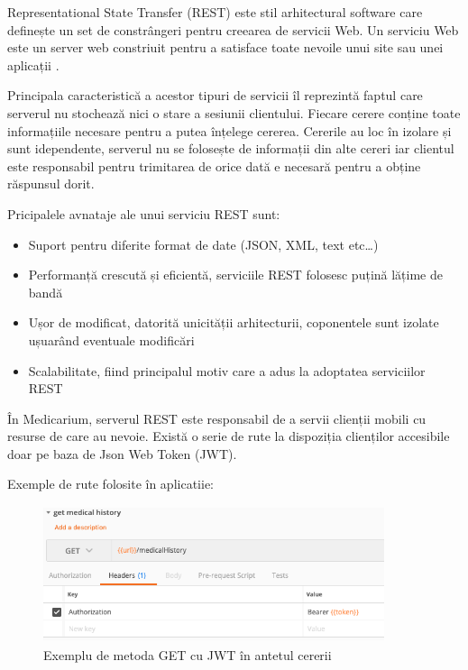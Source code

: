\documentclass[12pt]{article}
\begin{document}
Representational State Transfer (REST) este stil arhitectural software care definește
un set de constrângeri pentru creearea de servicii Web. Un serviciu Web este un server web
constriuit pentru a satisface toate nevoile unui site sau unei aplicații \cite{masse2011rest}.

Principala caracteristică a acestor tipuri de servicii îl reprezintă faptul care serverul
nu stochează nici o stare a sesiunii clientului. Fiecare cerere conține toate informațiile
necesare pentru a putea înțelege cererea. Cererile au loc în izolare și sunt idependente, serverul
nu se folosește de informații din alte cereri iar clientul este responsabil pentru trimitarea de
orice dată e necesară pentru a obține răspunsul dorit.

Pricipalele avnataje ale unui serviciu REST sunt:

\begin{itemize}
    \item Suport pentru diferite format de date (JSON, XML, text etc\dots)
    \item Performanță crescută și eficientă, serviciile REST folosesc puțină lățime de bandă
    \item Ușor de modificat, datorită unicității arhitecturii, coponentele sunt izolate
    ușuarând eventuale modificări
    \item Scalabilitate, fiind principalul motiv care a adus la adoptatea serviciilor REST \cite{masse2011rest}
\end{itemize}

În Medicarium, serverul REST este responsabil de a servii clienții mobili cu resurse de
care au nevoie. Există o serie de rute la dispoziția clienților accesibile doar pe baza 
de Json Web Token (JWT). 

\bigskip

Exemple de rute folosite în aplicatiie:


\begin{figure}[H]
\centering
\includegraphics[width=10cm, height=4cm]{get.png}
\caption{Exemplu de metoda GET cu JWT în antetul cererii}
\end{figure}
\end{document}
